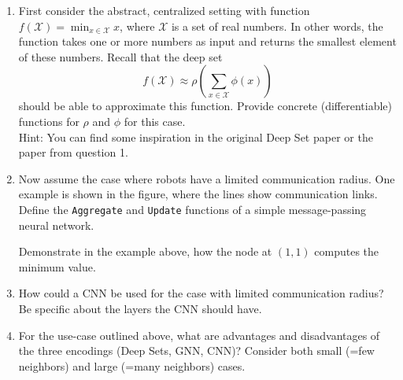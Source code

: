 \begin{enumerate}
\item First consider the abstract, centralized setting with function $f(\mathcal X) = \min_{x\in\mathcal X} x$, where $\mathcal X$ is a set of real numbers. In other words, the function takes one or more numbers as input and returns the smallest element of these numbers. Recall that the deep set 
\begin{equation}
f(\mathcal X) \approx \rho \left(\sum_{x\in\mathcal X} \phi(x) \right)
\end{equation}
should be able to approximate this function. Provide concrete (differentiable) functions for $\rho$ and $\phi$ for this case.\\
Hint: You can find some inspiration in the original Deep Set paper or the paper from question 1.


\item Now assume the case where robots have a limited communication radius. One example is shown in the figure, where the lines show communication links. Define the \texttt{Aggregate} and \texttt{Update} functions of a simple message-passing neural network.

Demonstrate in the example above, how the node at $(1,1)$ computes the minimum value.




% 

\item How could a CNN be used for the case with limited communication radius? Be specific about the layers the CNN should have.


\item For the use-case outlined above, what are advantages and disadvantages of the three encodings (Deep Sets, GNN, CNN)? Consider both small (=few neighbors) and large (=many neighbors) cases.


\end{enumerate}






